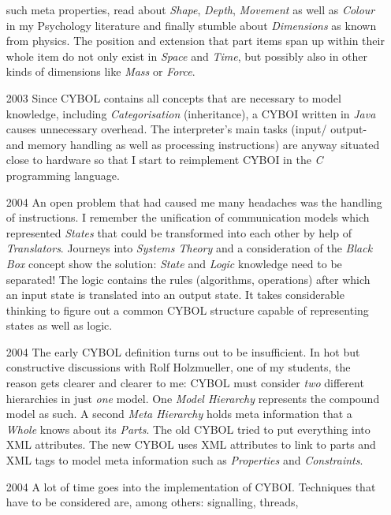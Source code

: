 \begin{itemize}
        such meta properties, read about \emph{Shape}, \emph{Depth},
        \emph{Movement} as well as \emph{Colour} in my Psychology literature
        and finally stumble about \emph{Dimensions} as known from physics. The
        position and extension that part items span up within their whole item
        do not only exist in \emph{Space} and \emph{Time}, but possibly also in
        other kinds of dimensions like \emph{Mass} or \emph{Force}.
    \item[2003] Since CYBOL contains all concepts that are necessary to model
        knowledge, including \emph{Categorisation} (inheritance), a CYBOI written
        in \emph{Java} causes unnecessary overhead. The interpreter's main tasks
        (input/ output- and memory handling as well as processing instructions)
        are anyway situated close to hardware so that I start to reimplement
        CYBOI in the \emph{C} programming language.
    \item[2004] An open problem that had caused me many headaches was the
        handling of instructions. I remember the unification of communication
        models which represented \emph{States} that could be transformed into
        each other by help of \emph{Translators}. Journeys into
        \emph{Systems Theory} and a consideration of the \emph{Black Box}
        concept show the solution: \emph{State} and \emph{Logic} knowledge need
        to be separated! The logic contains the rules (algorithms, operations)
        after which an input state is translated into an output state. It takes
        considerable thinking to figure out a common CYBOL structure capable of
        representing states as well as logic.
    \item[2004] The early CYBOL definition turns out to be insufficient. In hot
        but constructive discussions with Rolf Holzmueller, one of my students,
        the reason gets clearer and clearer to me: CYBOL must consider \emph{two}
        different hierarchies in just \emph{one} model. One \emph{Model Hierarchy}
        represents the compound model as such. A second \emph{Meta Hierarchy}
        holds meta information that a \emph{Whole} knows about its \emph{Parts}.
        The old CYBOL tried to put everything into XML attributes. The new CYBOL
        uses XML attributes to link to parts and XML tags to model meta
        information such as \emph{Properties} and \emph{Constraints}.
    \item[2004] A lot of time goes into the implementation of CYBOI. Techniques
        that have to be considered are, among others: signalling, threads,

\end{itemize}
